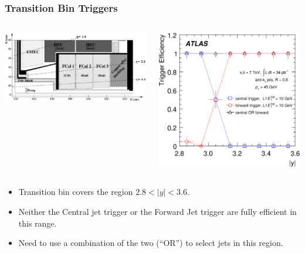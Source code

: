 \documentclass[10pt]{beamer}
\begin{document}
\begin{frame}\frametitle{Transition Bin Triggers}
\begin{center}
\begin{columns}
\begin{center}
\includegraphics[width=0.95\linewidth,angle=0]{atlas_EC_xsec2.eps}
\end{center}
\begin{center}
\includegraphics[width=0.7\linewidth,angle=0]{eta_efficiency_akt6.eps}
\end{center}
\end{columns}
\end{center}
\begin{itemize}
\item Transition bin covers the region $2.8 < |y| <3.6$.
\item Neither the Central jet trigger or the Forward Jet trigger are fully efficient in this range.
\item Need to use a combination of the two (``OR'') to select jets in this region.
\end{itemize}
\end{frame}
\end{document}
